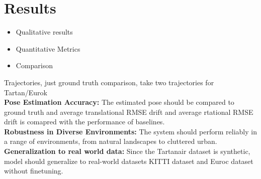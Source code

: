 \documentclass[10pt,letterpaper]{article}
\begin{document}

\section{Results}
\begin{itemize}
    \item Qualitative results
    \item Quantitative Metrics
    \item Comparison 
\end{itemize}

Trajectories, just ground truth comparison, take two trajectories for Tartan/Eurok \\
\textbf{Pose Estimation Accuracy:} The estimated pose should be compared to ground truth and average translational RMSE drift and average rtational RMSE drift is comapred with the performance of baselines. \\
\textbf{Robustness in Diverse Environments:} The system should perform reliably in a range of environments, from natural landscapes to cluttered urban.
\textbf{Generalization to real world data:} Since the Tartanair dataset is synthetic, model should generalize to real-world datasets KITTI dataset and Euroc dataset without finetuning.
\end{document}
